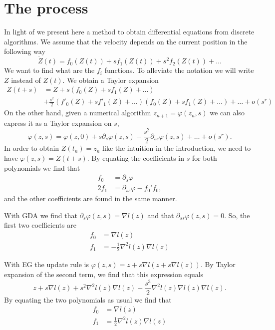 \documentclass[main.tex]{subfiles}
\begin{document}
\section{The process}
In light of \cite{luResolutionODEFramework2021} we present here a method to
obtain differential equations from discrete algorithms. We assume that the
velocity depends on the current position in the following way
\[ \dot Z(t) = f_0(Z(t)) + sf_1(Z(t)) + s^2f_2(Z(t)) + \dots \]
We want to find what are the $f_i$ functions.
To alleviate the notation we will write $Z$ instead of $Z(t)$.
We obtain a Taylor expansion
\begin{align*}
	Z(t + s) & = Z + s(f_0(Z) + sf_1(Z) + \dots)                                                      \\
	         & + \frac{s^2}{2}(f'_0(Z) + sf'_1(Z) + \dots)(f_0(Z) + sf_1(Z) + \dots) + \dots + o(s^r)
\end{align*}\label{eq:taylor-x}
On the other hand, given a numerical algorithm $z_{n+1} = \varphi(z_n, s)$
we can also express it as a Taylor expansion on $s$,
\[\varphi(z, s) = \varphi(z, 0) + s \partial_s \varphi(z, s) + \frac{s^2}{2} \partial_{ss} \varphi(z, s) + \dots + o(s^r) .\]
In order to obtain $Z(t_n) = z_n$ like the intuition in the introduction, we
need to have $\varphi(z,s) = Z(t+s)$.
By equating the coefficients in $s$ for both polynomials we find that
\begin{align*}
	f_0   & = \partial_s \varphi                \\
	2 f_1 & = \partial_{ss} \varphi - f_0' f_0,
\end{align*}
and the other coefficients are found in the same manner.

\begin{ex}
	With GDA we find that $\partial_s \varphi(z,s) = \nabla l(z)$ and that $\partial_{ss} \varphi(z,s) = 0$.
	So, the first two coefficients are \begin{align*}
		f_0 & = \nabla l(z)                            \\
		f_1 & = - \frac{1}{2}\nabla^2 l(z) \nabla l(z)
	\end{align*}
\end{ex}

\begin{ex}
	With EG the update rule is $\varphi(z,s) = z + s\nabla l(z + s\nabla
		l(z)).$ By Taylor expansion of the second term, we find that this
	expression equals
	\[z + s \nabla l(z) + s^2 \nabla^2 l(z) \nabla l(z) + \frac{s^3}{2}
		\nabla^2 l(z) \nabla l(z) \nabla l(z).\]
    By equating the two polynomials as usual we find that \begin{align*}
        f_0 &=  \nabla l(z) \\
        f_1 &= \frac{1}{2}\nabla^2 l(z) \nabla l(z)
    \end{align*}
\end{ex}
\end{document}
